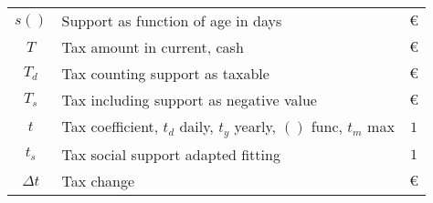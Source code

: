 \begin{center}
\begin{supertabular}{ c l c }
$ s()	$& Support as function of age in days		&$ \euro	$\\
$ T	$& Tax amount in current, cash			&$ \euro	$\\
$ T_d	$& Tax counting support as taxable		&$ \euro	$\\
$ T_s	$& Tax including support as negative value	&$ \euro	$\\
$t$&Tax coefficient, $t_d$ daily, $t_y$ yearly, $()$ func, $t_m$ max&$ 1$\\
$ t_s	$& Tax social support adapted fitting		&$ 1		$\\
$\Delta t$& Tax change					&$ \euro	$\\
\end{supertabular}
\end{center}
